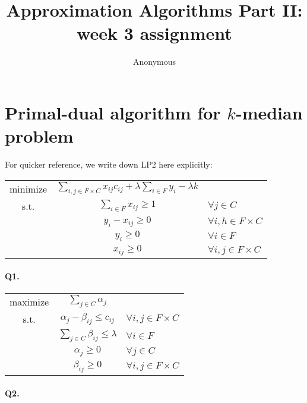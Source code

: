 \documentclass{article}
\begin{document}
\title{Approximation Algorithms Part II: week 3 assignment}
\author{Anonymous}

\maketitle

\newcommand{\abs}[1]{|#1|}
\newcommand{\cost}{\text{cost}}
\newcommand{\opt}{\text{OPT}\xspace}
\newcommand{\p}{\text{Prob}\xspace}

\section*{Primal-dual algorithm for $k$-median problem}

For quicker reference, we write down LP2 here explicitly:


\begin{tabular}{ccl}
  minimize  & $\sum_{i, j \in F\times C} x_{ij} c_{ij} + \lambda \sum_{i \in F} y_i - \lambda k$ & \\
  s.t.      & $\sum_{i \in F} x_{ij} \ge 1$ & $\forall j \in C$ \\
            & $y_i - x_{ij} \ge 0$ & $\forall i, h \in F\times C$ \\
            & $y_{i} \ge 0$ & $\forall i \in F$ \\
            & $x_{ij} \ge 0$ & $\forall i, j \in F\times C$
\end{tabular}

\paragraph{Q1. }

\begin{tabular}{ccl}
  maximize  & $\sum_{j \in C} \alpha_j$ & \\
  s.t.      & $\alpha_j - \beta_{ij} \le c_{ij}$ & $\forall i,j \in F\times C$ \\
            & $\sum_{j \in C} \beta_{ij} \le \lambda$ & $\forall i \in F$ \\
            & $\alpha_j \ge 0$ & $\forall j \in C$ \\
            & $\beta_{ij} \ge 0$ & $\forall i, j \in F\times C$
\end{tabular}

\paragraph{Q2. }
\end{document}
